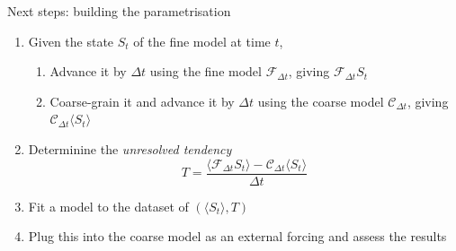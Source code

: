 \documentclass[12pt, aspectratio=169]{beamer}
\begin{document}
\begin{frame}{Next steps: building the parametrisation}
\begin{enumerate}
    \item Given the state $S_t$ of the fine model at time $t$,
    \begin{enumerate}[i]
        \item Advance it by $\Delta t$ using the fine model
            $\mathcal{F}_{\Delta t}$, giving $\mathcal{F}_{\Delta t} S_t$
        \item Coarse-grain it and advance it by $\Delta t$ using the coarse
        model $\mathcal{C}_{\Delta t}$, giving
        $\mathcal{C}_{\Delta t} \langle S_t \rangle$
    \end{enumerate}
    \item Determinine the \emph{unresolved tendency}
        \[
            T = \frac{
                \langle \mathcal{F}_{\Delta t} S_t \rangle
                - \mathcal{C}_{\Delta t} \langle S_t \rangle
            }{
                \Delta t
            }
        \]
    \item Fit a model to the dataset of $(\langle S_t \rangle, T)$
    \item Plug this into the coarse model as an external forcing and
        assess the results
\end{enumerate}
\end{frame}
\end{document}
